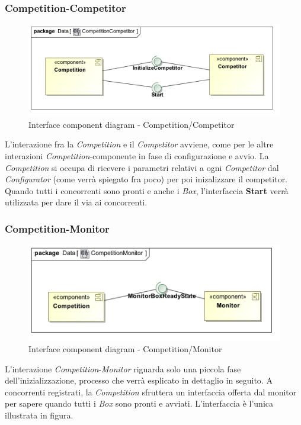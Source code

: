 \subsubsection{Competition-Competitor}
\begin{center}
\begin{figure}[h!]
	\includegraphics[scale=0.55]{img/InteractionDiagram/Implementation_Diagram__CompetitionCompetitor.jpg}
\caption{Interface component diagram - Competition/Competitor}
\end{figure}
\end{center}
L'interazione fra la \emph{Competition} e il \emph{Competitor} avviene, come per le altre interazioni \emph{Competition}-componente in fase di configurazione
e avvio. La \emph{Competition} si occupa di ricevere i parametri relativi a ogni \emph{Competitor} dal \emph{Configurator} (come verr\`{a} spiegato fra poco) per 
poi inizalizzare il competitor. Quando tutti i concorrenti sono pronti e anche i \emph{Box}, l'interfaccia \textbf{Start} verr\`{a} utilizzata per dare il
via ai concorrenti.
\subsubsection{Competition-Monitor}
\begin{center}
\begin{figure}[h!]
	\includegraphics[scale=0.55]{img/InteractionDiagram/Implementation_Diagram__CompetitionMonitor.jpg}
\caption{Interface component diagram - Competition/Monitor}
\end{figure}
\end{center}
L'interazione \emph{Competition}-\emph{Monitor} riguarda solo una piccola fase dell'inizializzazione, processo che verr\`{a} esplicato in dettaglio in seguito.
A concorrenti registrati, la \emph{Competition} sfruttera un interfaccia offerta dal monitor per sapere quando tutti i \emph{Box} sono pronti e avviati.
L'interfaccia \`{e} l'unica illustrata in figura.
